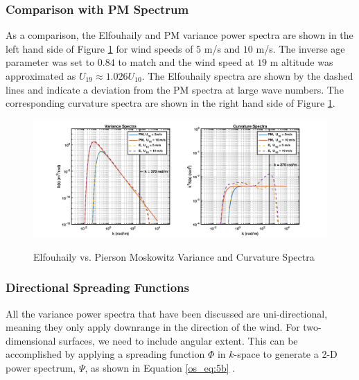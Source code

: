 \subsubsection {Comparison with PM Spectrum}
As a comparison, the Elfouhaily and PM variance power spectra are shown in the left hand side of Figure \ref{os_fig:2} for wind speeds of $5$ m/s and $10$ m/s. The inverse age parameter was set to $0.84$ to match and the wind speed at $19$ m altitude was approximated as $U_{19} \approx 1.026 U_{10}$. The Elfouhaily spectra are shown by the dashed lines and indicate a deviation from the PM spectra at large wave numbers. The corresponding curvature spectra are shown in the right hand side of Figure \ref{os_fig:2}.
 
\begin{figure}[ht]
  \begin{center}
\includegraphics[width=6in]{../media/Ocean_Surface/elf_vs_PM_variance_curvature_spectrum.png}
  \end{center}
  \renewcommand{\baselinestretch}{1} \small\normalsize
  \begin{quote}
    \caption[Elfouhaily vs. Pierson Moskowitz Variance and Curvature Spectra]{Elfouhaily vs. Pierson Moskowitz Variance and Curvature Spectra\label{os_fig:2}}
  \end{quote}
\end{figure}
\renewcommand{\baselinestretch}{2} \small\normalsize

\subsubsection{Directional Spreading Functions}
All the variance power spectra that have been discussed are uni-directional, meaning they only apply downrange in the direction of the wind. For two-dimensional surfaces, we need to include angular extent. This can be accomplished by applying a spreading function $\Phi$ in $k$-space to generate a 2-D power spectrum, $\Psi$, as shown in Equation \ref{os_eq:5b} \cite{elfouhaily}.


